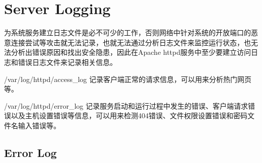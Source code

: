 \begin{lstlisting}[language=bash]

\end{lstlisting}




\begin{lstlisting}[language=bash]

\end{lstlisting}




\begin{lstlisting}[language=bash]

\end{lstlisting}




\begin{lstlisting}[language=bash]

\end{lstlisting}




\begin{lstlisting}[language=bash]

\end{lstlisting}




\begin{lstlisting}[language=bash]

\end{lstlisting}




\section{Server Logging}

为系统服务建立日志文件是必不可少的工作，否则网络中针对系统的开放端口的恶意连接尝试等攻击就无法记录，也就无法通过分析日志文件来监控运行状态，也无法分析出错误原因和找出安全隐患，因此在Apache httpd服务中至少要建立访问日志和错误日志文件来记录相关信息。

\begin{compactitem}
\item /var/log/httpd/access\_log 记录客户端正常的请求信息，可以用来分析热门网页等。
\item /var/log/httpd/error\_log 记录服务启动和运行过程中发生的错误、客户端请求错误以及主机设置错误等信息，可以用来检测404错误、文件权限设置错误和密码文件名输入错误等。
\end{compactitem}

\subsection{Error Log}


